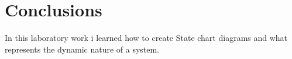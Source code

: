 \section*{Conclusions}
In this laboratory work i learned how to create State chart diagrams and what represents the dynamic nature of a system. 
\clearpage